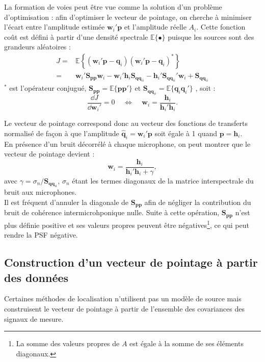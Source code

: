 La formation de voies peut être vue comme la solution d'un problème d'optimisation : afin d'optimiser le vecteur de pointage, on cherche à minimiser l'écart entre l'amplitude estimée $\bm{w}_i'\bm{p}$ et l'amplitude réelle $A_i$. Cette fonction coût est défini à partir d'une densité spectrale $\mathbb{E}\{\bullet\}$ puisque les sources sont des grandeurs aléatoires :
\begin{align}
	J=&\mathbb{E}\left\{ (\bm{w}_i'\bm{p}-\bm{q}_i)(\bm{w}_i'\bm{p}-\bm{q}_i)^* \right\}\\
	 =& \bm{w}_i'\bm{S_{pp}}\bm{w}_i-\bm{w}_i'\bm{h}_i\bm{S}_{\bm{qq}_{ii}}-\bm{h}_i'\bm{S}_{\bm{qq}_{ii}}'\bm{w}_i + \bm{S}_{\bm{qq}_{ii}}
\end{align}
$^*$ est l'opérateur conjugué, $\bm{S_{pp}}=\mathbb{E}\{\bm{p}\bm{p}'\}$ et $\bm{S}_{\bm{qq}_{ii}}=\mathbb{E}\{\bm{q}_i\bm{q}_i'\}$ , soit : 
\begin{equation}
	\frac{\dd J}{\dd \bm{w}_i'}=0 ~~~~~\Leftrightarrow ~~~~~ \bm{w}_i=\frac{\bm{h}_i}{\bm{h}_i'\bm{h}_i}.
\end{equation}

Le vecteur de pointage correspond donc au vecteur des fonctions de transferts normalisé de façon à que l'amplitude $\hat{\bm{q}}_i=\bm{w}_i'\bm{p}$ soit égale à 1 quand $\bm{p}=\bm{h}_i$.\\

En présence d'un bruit décorrélé à chaque microphone, on peut montrer que le vecteur de pointage devient : 
\begin{equation}
	\bm{w}_i=\frac{\bm{h}_i}{\bm{h}_i'\bm{h}_i+\gamma},
\end{equation}
avec $\gamma=\sigma_{n}/\bm{S}_{\bm{qq}_{ii}}$, $\sigma_{n}$ étant les termes diagonaux de la matrice interspectrale du bruit aux microphones.\\

Il est fréquent d'annuler la diagonale de $\bm{S_{pp}}$ afin de négliger la contribution du bruit de cohérence intermicrohponique nulle. Suite à cette opération, $\bm{S_{pp}}$  n'est plus définie positive et ses valeurs propres peuvent être négatives\footnote{La somme des valeurs propres de $A$ est égale à la somme de ses éléments diagonaux.}, ce qui peut rendre la PSF négative.




\subsection{Construction d'un vecteur de pointage à partir des données}
Certaines méthodes de localisation n'utilisent pas un modèle de source mais construisent le vecteur de pointage à partir de l'ensemble des covariances des signaux de mesure. \\
